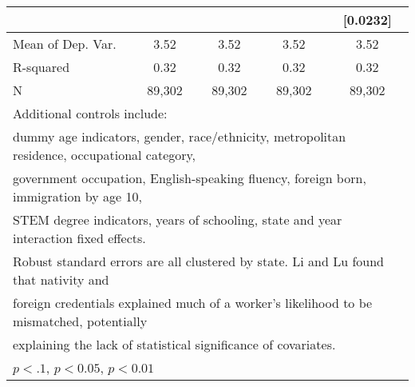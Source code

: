 \begin{table}[htbp]
\begin{tabular}{l*{4}{c}}
                    &                     &                     &                     &    [0.0232]         \\
\midrule
Mean of Dep. Var.   &        3.52         &        3.52         &        3.52         &        3.52         \\
R-squared           &        0.32         &        0.32         &        0.32         &        0.32         \\
N                   &      89,302         &      89,302         &      89,302         &      89,302         \\
\bottomrule
\multicolumn{5}{l}{\footnotesize Additional controls include:}\\
\multicolumn{5}{l}{\footnotesize dummy age indicators, gender, race/ethnicity, metropolitan residence, occupational category,}\\
\multicolumn{5}{l}{\footnotesize government occupation, English-speaking fluency, foreign born, immigration by age 10,}\\
\multicolumn{5}{l}{\footnotesize STEM degree indicators, years of schooling, state and year interaction fixed effects.}\\
\multicolumn{5}{l}{\footnotesize Robust standard errors are all clustered by state. Li and Lu found that nativity and}\\
\multicolumn{5}{l}{\footnotesize foreign credentials explained much of a worker's likelihood to be mismatched, potentially}\\
\multicolumn{5}{l}{\footnotesize explaining the lack of statistical significance of covariates.}\\
\multicolumn{5}{l}{\footnotesize \sym{*} \(p<.1\), \sym{**} \(p<0.05\), \sym{***} \(p<0.01\)}\\
\end{tabular}
\end{table}
